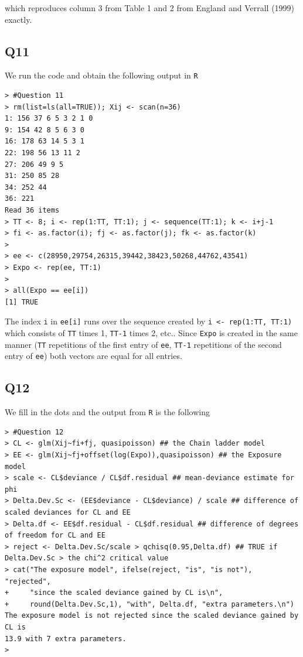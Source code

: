 \documentclass[11pt]{article}
\begin{document}
which reproduces column 3 from Table 1 and 2 from England and Verrall (1999) exactly.

\subsection*{Q11}
We run the code and obtain the following output in \verb|R|

\begin{verbatim}
> #Question 11
> rm(list=ls(all=TRUE)); Xij <- scan(n=36)
1: 156 37 6 5 3 2 1 0
9: 154 42 8 5 6 3 0
16: 178 63 14 5 3 1
22: 198 56 13 11 2
27: 206 49 9 5
31: 250 85 28
34: 252 44
36: 221
Read 36 items
> TT <- 8; i <- rep(1:TT, TT:1); j <- sequence(TT:1); k <- i+j-1
> fi <- as.factor(i); fj <- as.factor(j); fk <- as.factor(k)
> 
> ee <- c(28950,29754,26315,39442,38423,50268,44762,43541)
> Expo <- rep(ee, TT:1)
> 
> all(Expo == ee[i])
[1] TRUE
\end{verbatim}

The index \verb|i| in \verb|ee[i]| runs over the sequence created by \verb|i <- rep(1:TT, TT:1)| which consists of \verb|TT| times 1, \verb|TT-1| times 2, etc.. Since \verb|Expo| is created in the same manner (\verb|TT| repetitions of the first entry of \verb|ee|, \verb|TT-1| repetitions of the second entry of \verb|ee|) both vectors are equal for all entries.

\subsection*{Q12}
We fill in the dots and the output from \verb|R| is the following

\begin{verbatim}
> #Question 12
> CL <- glm(Xij~fi+fj, quasipoisson) ## the Chain ladder model
> EE <- glm(Xij~fj+offset(log(Expo)),quasipoisson) ## the Exposure model
> scale <- CL$deviance / CL$df.residual ## mean-deviance estimate for phi
> Delta.Dev.Sc <- (EE$deviance - CL$deviance) / scale ## difference of scaled deviances for CL and EE
> Delta.df <- EE$df.residual - CL$df.residual ## difference of degrees of freedom for CL and EE
> reject <- Delta.Dev.Sc/scale > qchisq(0.95,Delta.df) ## TRUE if Delta.Dev.Sc > the chi^2 critical value
> cat("The exposure model", ifelse(reject, "is", "is not"), "rejected",
+     "since the scaled deviance gained by CL is\n",
+     round(Delta.Dev.Sc,1), "with", Delta.df, "extra parameters.\n")
The exposure model is not rejected since the scaled deviance gained by CL is
13.9 with 7 extra parameters.
>
\end{verbatim}
\end{document}
